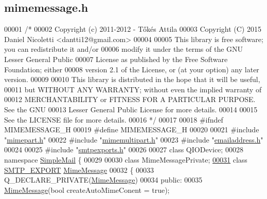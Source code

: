 \hypertarget{mimemessage_8h_source}{}\subsection{mimemessage.\+h}
\label{mimemessage_8h_source}

\begin{DoxyCode}
00001 \textcolor{comment}{/*}
00002 \textcolor{comment}{  Copyright (c) 2011-2012 - Tőkés Attila}
00003 \textcolor{comment}{  Copyright (C) 2015 Daniel Nicoletti <dantti12@gmail.com>}
00004 \textcolor{comment}{}
00005 \textcolor{comment}{  This library is free software; you can redistribute it and/or}
00006 \textcolor{comment}{  modify it under the terms of the GNU Lesser General Public}
00007 \textcolor{comment}{  License as published by the Free Software Foundation; either}
00008 \textcolor{comment}{  version 2.1 of the License, or (at your option) any later version.}
00009 \textcolor{comment}{}
00010 \textcolor{comment}{  This library is distributed in the hope that it will be useful,}
00011 \textcolor{comment}{  but WITHOUT ANY WARRANTY; without even the implied warranty of}
00012 \textcolor{comment}{  MERCHANTABILITY or FITNESS FOR A PARTICULAR PURPOSE.  See the GNU}
00013 \textcolor{comment}{  Lesser General Public License for more details.}
00014 \textcolor{comment}{}
00015 \textcolor{comment}{  See the LICENSE file for more details.}
00016 \textcolor{comment}{*/}
00017 
00018 \textcolor{preprocessor}{#ifndef MIMEMESSAGE\_H}
00019 \textcolor{preprocessor}{#define MIMEMESSAGE\_H}
00020 
00021 \textcolor{preprocessor}{#include "\hyperlink{mimepart_8h}{mimepart.h}"}
00022 \textcolor{preprocessor}{#include "\hyperlink{mimemultipart_8h}{mimemultipart.h}"}
00023 \textcolor{preprocessor}{#include "\hyperlink{emailaddress_8h}{emailaddress.h}"}
00024 
00025 \textcolor{preprocessor}{#include "\hyperlink{smtpexports_8h}{smtpexports.h}"}
00026 
00027 \textcolor{keyword}{class }QIODevice;
00028 \textcolor{keyword}{namespace }\hyperlink{namespace_simple_mail}{SimpleMail} \{
00029 
00030 \textcolor{keyword}{class }MimeMessagePrivate;
\hyperlink{class_simple_mail_1_1_mime_message}{00031} \textcolor{keyword}{class }\hyperlink{smtpexports_8h_ac580c9660cb24a34b13807f4eb0e1bd0}{SMTP\_EXPORT} \hyperlink{class_simple_mail_1_1_mime_message}{MimeMessage}
00032 \{
00033     Q\_DECLARE\_PRIVATE(\hyperlink{class_simple_mail_1_1_mime_message}{MimeMessage})
00034 \textcolor{keyword}{public}:
00035     \hyperlink{class_simple_mail_1_1_mime_message}{MimeMessage}(\textcolor{keywordtype}{bool} createAutoMimeConent = \textcolor{keyword}{true});

\end{DoxyCode}
